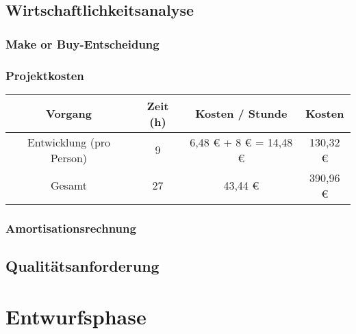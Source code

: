 \documentclass[12pt]{article} %
\begin{document}
	\subsection{Wirtschaftlichkeitsanalyse}
	\label{subsec:wirtschaftlichkeitsanalyse}
	\wirtschaftlichkeitsanalyseText
	
	\subsubsection{Make or Buy-Entscheidung}
	\label{subsubsec:makeorbuy}
	\makeorbuyText
	
	\subsubsection{Projektkosten}
	\label{subsubsec:projektkosten}
	\projektkostenText
	\neuerAbsatz
	\begin{center}
	\begin{tabular}{|c|c|c|c|}
	\hline
	Vorgang & Zeit (h) & Kosten / Stunde & Kosten \\
	\hline
	Entwicklung (pro Person) & 9 & 6,48 € + 8 € = 14,48 € & 130,32 € \\
	\hline
	Gesamt & 27 & 43,44 € & 390,96 € \\
	\hline
	\end{tabular}
	\end{center}
	\label{tab:tabelle2}
	
	\subsubsection{Amortisationsrechnung}
	\label{subsubsec:amortisationsrechnung}
	\amortisationsrechnungText
	
	\subsection{Qualitätsanforderung}
	\label{subsec:qualitaetsanforderung}
	\qualitaetsanforderungText
	
	
	\section{Entwurfsphase}
	\label{sec:entwurfsphase}
	\entwurfsphaseText
	
\end{document}

